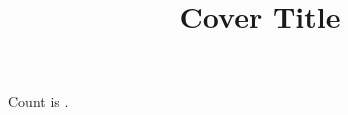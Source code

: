 \documentclass{article}
\begin{document}
\begin{titlepage}
\title{Cover Title}
\end{titlepage}
Count is \thetcount.
\end{document}
